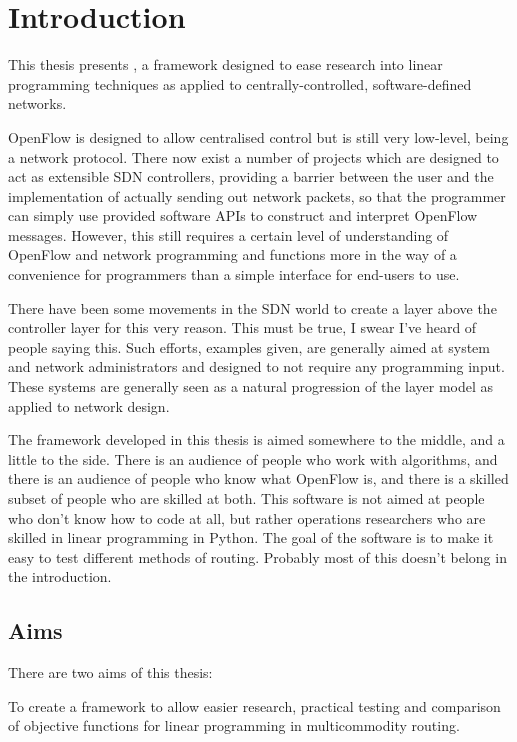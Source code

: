 \chapter{Introduction}

This thesis presents \thesis, a framework designed to ease research into linear programming techniques as applied to centrally-controlled, software-defined networks.

OpenFlow is designed to allow centralised control but is still very low-level, being a network protocol. There now exist a number of projects which are designed to act as extensible SDN controllers, providing a barrier between the user and the implementation of actually sending out network packets, so that the programmer can simply use provided software APIs to construct and interpret OpenFlow messages. However, this still requires a certain level of understanding of OpenFlow and network programming and functions more in the way of a convenience for programmers than a simple interface for end-users to use.

There have been some movements in the SDN world to create a layer above the controller layer for this very reason. This must be true, I swear I've heard of people saying this. Such efforts, examples given, are generally aimed at system and network administrators and designed to not require any programming input. These systems are generally seen as a natural progression of the layer model as applied to network design.

The framework developed in this thesis is aimed somewhere to the middle, and a little to the side. There is an audience of people who work with algorithms, and there is an audience of people who know what OpenFlow is, and there is a skilled subset of people who are skilled at both. This software is not aimed at people who don't know how to code at all, but rather operations researchers who are skilled in linear programming in Python. The goal of the software is to make it easy to test different methods of routing. Probably most of this doesn't belong in the introduction.

\section{Aims}

There are two aims of this thesis:

To create a framework to allow easier research, practical testing and comparison of objective functions for linear programming in multicommodity routing.

